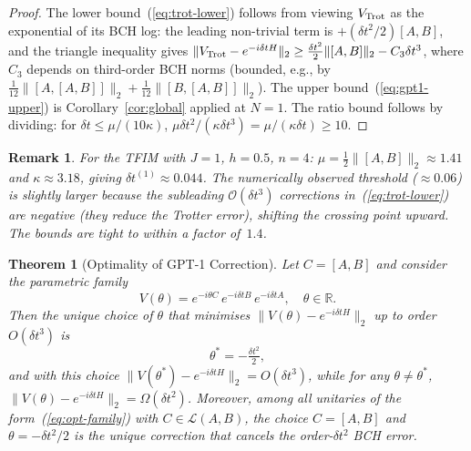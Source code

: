 \documentclass[aps,prxquantum,twocolumn,nofootinbib]{revtex4-2}
\newtheorem{theorem}{Theorem}
\newtheorem{remark}{Remark}
\begin{document}
\begin{proof}
  The lower bound~(\ref{eq:trot-lower}) follows from viewing
  $V_{\rm Trot}$ as the exponential of its BCH log: the leading
  non-trivial term is $+(\delta t^2/2)[A,B]$, and the triangle
  inequality gives
  $\|V_{\rm Trot}-e^{-i\delta t H}\|_2
   \geq \tfrac{\delta t^2}{2}\|[A,B]\|_2 - C_3\delta t^3$,
  where $C_3$ depends on third-order BCH norms (bounded, e.g.,
  by $\tfrac{1}{12}\|[A,[A,B]]\|_2 +
     \tfrac{1}{12}\|[B,[A,B]]\|_2$).
  The upper bound~(\ref{eq:gpt1-upper}) is Corollary~\ref{cor:global}
  applied at $N=1$.
  The ratio bound follows by dividing:
  for $\delta t\leq\mu/(10\kappa)$,
  $\mu\delta t^2 / (\kappa\delta t^3) = \mu/(\kappa\delta t)\geq 10$.
\end{proof}

\begin{remark}
  For the TFIM with $J=1$, $h=0.5$, $n=4$:
  $\mu = \tfrac{1}{2}\|[A,B]\|_2\approx1.41$ and
  $\kappa\approx3.18$, giving
  $\delta t^{(1)}\approx 0.044$.
  The numerically observed threshold ($\approx0.06$) is slightly
  larger because the subleading $\mathcal{O}(\delta t^3)$ corrections
  in~(\ref{eq:trot-lower}) are negative (they reduce the Trotter
  error), shifting the crossing point upward.
  The bounds are tight to within a factor of~$1.4$.
\end{remark}

\begin{theorem}[Optimality of GPT-1 Correction]
  \label{thm:optimality}
  Let $C=[A,B]$ and consider the parametric family
  \begin{equation}
    V(\theta) = e^{-i\theta C}\,e^{-i\delta t B}\,e^{-i\delta t A},
    \quad \theta\in\mathbb{R}.
    \label{eq:opt-family}
  \end{equation}
  Then the unique choice of $\theta$ that minimises
  $\|V(\theta)-e^{-i\delta t H}\|_2$ up to order $O(\delta t^3)$ is
  \begin{equation}
    \theta^* = -\tfrac{\delta t^2}{2},
    \label{eq:opt-theta}
  \end{equation}
  and with this choice $\|V(\theta^*)-e^{-i\delta t H}\|_2=O(\delta t^3)$,
  while for any $\theta\neq\theta^*$,
  $\|V(\theta)-e^{-i\delta t H}\|_2=\Omega(\delta t^2)$.
  Moreover, among all unitaries of the form~(\ref{eq:opt-family})
  with $C\in\mathcal{L}(A,B)$, the choice $C=[A,B]$ and
  $\theta=-\delta t^2/2$ is the \emph{unique} correction that
  cancels the order-$\delta t^2$ BCH error.
\end{theorem}
\end{document}
